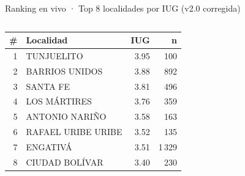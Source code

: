\documentclass[aspectratio=169,11pt]{beamer}
\begin{document}
\begin{frame}{Ranking en vivo · Top 8 localidades por IUG (v2.0 corregida)}
  \begin{columns}[T,onlytextwidth]
      \scriptsize
      \begin{tabular}{rlrr}
        \toprule
        \# & \textbf{Localidad} & \textbf{IUG} & \textbf{n} \\
        \midrule
        1 & TUNJUELITO          & 3.95 &   100 \\
        2 & BARRIOS UNIDOS      & 3.88 &   892 \\
        3 & SANTA FE            & 3.81 &   496 \\
        4 & LOS MÁRTIRES        & 3.76 &   359 \\
        5 & ANTONIO NARIÑO      & 3.58 &   163 \\
        6 & RAFAEL URIBE URIBE  & 3.52 &   135 \\
        7 & ENGATIVÁ            & 3.51 & 1\,329 \\
        8 & CIUDAD BOLÍVAR      & 3.40 &   230 \\
        \bottomrule
      \end{tabular}


\end{columns}
\end{frame}
\end{document}
